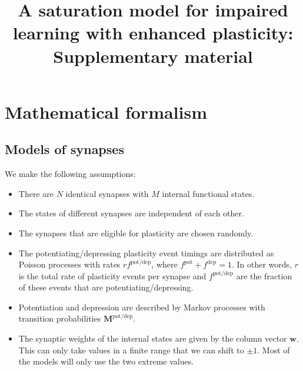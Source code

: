 \documentclass[12pt]{article}
\title{A saturation model for impaired learning with enhanced plasticity: Supplementary material}
\newcommand{\w}{\mathbf{w}}
\newcommand{\M}{\mathbf{M}}
\newcommand{\pot}{^{\text{pot}}}
\newcommand{\dep}{^{\text{dep}}}
\newcommand{\potdep}{^{\text{pot/dep}}}
\begin{document}
\maketitle





\tableofcontents
\listoffigures


\section{Mathematical formalism}\label{sec:setup}


\subsection{Models of synapses}\label{sec:synapse}

We make the following assumptions:
\begin{itemize}
  \item There are $N$ identical synapses with $M$ internal functional states.
  \item The states of different synapses are independent of each other.
  \item The synapses that are eligible for plasticity are chosen randomly.
  \item The potentiating/depressing plasticity event timings are distributed as Poisson processes with rates $rf\potdep$, where $f\pot+f\dep=1$.
      In other words, $r$ is the total rate of plasticity events per synapse and $f\potdep$ are the fraction of these events that are potentiating/depressing.
  \item Potentiation and depression are described by Markov processes with transition probabilities $\M\potdep$.
  \item The synaptic weights of the internal states are given by the column vector $\w$. This can only take values in a finite range that we can shift to $\pm1$. Most of the models will only use the two extreme values.
\end{itemize}
\end{document}
